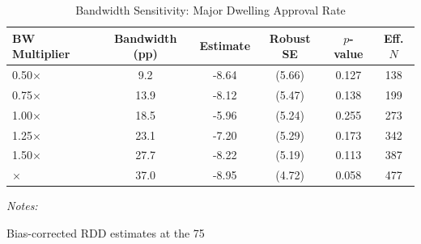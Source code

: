\begin{table}[!h]
\centering
\caption{\label{tab:tab:bw_sensitivity}Bandwidth Sensitivity: Major Dwelling Approval Rate}
\centering
\begin{threeparttable}
\begin{tabular}[t]{lccccc}
\toprule
BW Multiplier & Bandwidth (pp) & Estimate & Robust SE & $p$-value & Eff. $N$\\
\midrule
0.50$\times$ & 9.2 & -8.64 & (5.66) & 0.127 & 138\\
0.75$\times$ & 13.9 & -8.12 & (5.47) & 0.138 & 199\\
1.00$\times$ & 18.5 & -5.96 & (5.24) & 0.255 & 273\\
1.25$\times$ & 23.1 & -7.20 & (5.29) & 0.173 & 342\\
1.50$\times$ & 27.7 & -8.22 & (5.19) & 0.113 & 387\\
\addlinespace
2.00$\times$ & 37.0 & -8.95 & (4.72) & 0.058 & 477\\
\bottomrule
\end{tabular}
\begin{tablenotes}
\item \textit{Notes:} 
\item Bias-corrected RDD estimates at the 75%
\end{tablenotes}
\end{threeparttable}
\end{table}
